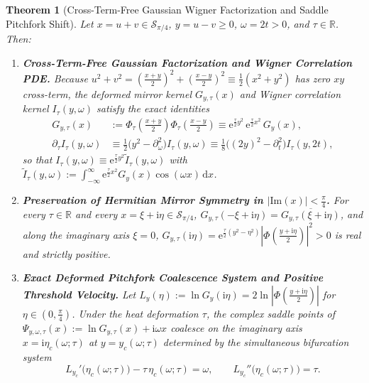 \documentclass[11pt,reqno]{amsart}
\newtheorem{theorem}{Theorem}[section]
\theoremstyle{definition}
\theoremstyle{remark}
\numberwithin{equation}{section}
\newcommand{\R}{\mathbb{R}}
\newcommand{\dd}{\mathrm{d}}
\newcommand{\ee}{\mathrm{e}}
\newcommand{\ii}{\mathrm{i}}
\newcommand{\Ima}{\mathrm{Im}}
\begin{document}
\begin{theorem}[Cross-Term-Free Gaussian Wigner Factorization and Saddle Pitchfork Shift]\label{thm:wigner_factorization}
Let $x = u+v \in \mathcal{S}_{\pi/4}$, $y = u-v \ge 0$, $\omega = 2t > 0$, and $\tau \in \R$. Then:
\begin{enumerate}[label=\textup{(\roman*)},leftmargin=2.2em]
\item \textbf{Cross-Term-Free Gaussian Factorization and Wigner Correlation PDE.} Because $u^2 + v^2 = (\frac{x+y}{2})^2 + (\frac{x-y}{2})^2 \equiv \frac{1}{2}(x^2 + y^2)$ has zero $xy$ cross-term, the deformed mirror kernel $G_{y,\tau}(x)$ and Wigner correlation kernel $I_\tau(y,\omega)$ satisfy the exact identities
\begin{equation}\label{eq:boxed_wigner_factorization}
\boxed{\begin{aligned}
G_{y,\tau}(x) &:= \Phi_\tau\!\left(\frac{x+y}{2}\right)\Phi_\tau\!\left(\frac{x-y}{2}\right) \equiv \ee^{\frac{\tau}{2}y^2}\,\ee^{\frac{\tau}{2}x^2}\,G_y(x), \\
\partial_\tau I_\tau(y,\omega) &\equiv \frac{1}{2}\bigl(y^2 - \partial_\omega^2\bigr)I_\tau(y,\omega) \equiv \frac{1}{8}\bigl((2y)^2 - \partial_t^2\bigr)I_\tau(y,2t),
\end{aligned}}
\end{equation}
so that $I_\tau(y,\omega) \equiv \ee^{\frac{\tau}{2}y^2}\widetilde{I}_\tau(y,\omega)$ with $\widetilde{I}_\tau(y,\omega) := \int_{-\infty}^\infty \ee^{\frac{\tau}{2}x^2}G_y(x)\cos(\omega x)\,\dd x$.
\item \textbf{Preservation of Hermitian Mirror Symmetry in $|\Ima(x)| < \frac{\pi}{4}$.} For every $\tau \in \R$ and every $x = \xi + \ii\eta \in \mathcal{S}_{\pi/4}$, $G_{y,\tau}(-\xi + \ii\eta) = \overline{G_{y,\tau}(\xi + \ii\eta)}$, and along the imaginary axis $\xi = 0$, $G_{y,\tau}(\ii\eta) = \ee^{\frac{\tau}{2}(y^2-\eta^2)}|\Phi(\frac{y+\ii\eta}{2})|^2 > 0$ is real and strictly positive.
\item \textbf{Exact Deformed Pitchfork Coalescence System and Positive Threshold Velocity.} Let $L_y(\eta) := \ln G_y(\ii\eta) = 2\ln|\Phi(\frac{y+\ii\eta}{2})|$ for $\eta \in (0, \frac{\pi}{4})$. Under the heat deformation $\tau$, the complex saddle points of $\Psi_{y,\omega,\tau}(x) := \ln G_{y,\tau}(x) + \ii\omega x$ coalesce on the imaginary axis $x = \ii\eta_c(\omega;\tau)$ at $y = y_c(\omega;\tau)$ determined by the simultaneous bifurcation system
\begin{equation}\label{eq:deformed_pitchfork_system}
L_{y_c}'\bigl(\eta_c(\omega;\tau)\bigr) - \tau\,\eta_c(\omega;\tau) = \omega, \qquad L_{y_c}''\bigl(\eta_c(\omega;\tau)\bigr) = \tau.

\end{equation}
\end{enumerate}
\end{theorem}
\end{document}
